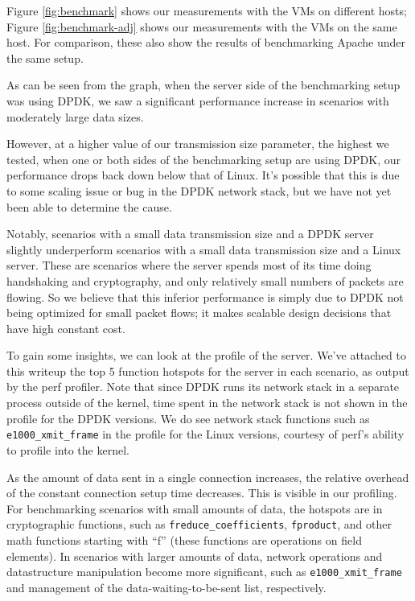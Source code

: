 \documentclass{sig-alternate-05-2015}
\begin{document}
Figure \ref{fig:benchmark} shows our measurements with the VMs on different hosts;
Figure \ref{fig:benchmark-adj} shows our measurements with the VMs on the same host.
For comparison, these also show the results of benchmarking Apache under the same setup.

As can be seen from the graph, when the server side of the benchmarking setup was using DPDK,
we saw a significant performance increase in scenarios with moderately large data sizes.

However, at a higher value of our transmission size parameter, the highest we tested,
when one or both sides of the benchmarking setup are using DPDK,
our performance drops back down below that of Linux.
It's possible that this is due to some scaling issue or bug in the DPDK network stack,
but we have not yet been able to determine the cause.

Notably, scenarios with a small data transmission size and a DPDK server
slightly underperform scenarios with a small data transmission size and a Linux server.
These are scenarios where the server spends most of its time doing handshaking and cryptography,
and only relatively small numbers of packets are flowing.
So we believe that this inferior performance is simply due to DPDK not being optimized for small packet flows;
it makes scalable design decisions that have high constant cost.

To gain some insights, we can look at the profile of the server.
We've attached to this writeup the top 5 function hotspots for the server in each scenario,
as output by the perf profiler.
Note that since DPDK runs its network stack in a separate process outside of the kernel,
time spent in the network stack is not shown in the profile for the DPDK versions.
We do see network stack functions such as \verb|e1000_xmit_frame| in the profile for the Linux versions,
courtesy of perf's ability to profile into the kernel.

As the amount of data sent in a single connection increases,
the relative overhead of the constant connection setup time decreases.
This is visible in our profiling.
For benchmarking scenarios with small amounts of data, the hotspots are in cryptographic functions,
such as \verb|freduce_coefficients|, \verb|fproduct|, and other math functions starting with ``f''
(these functions are operations on field elements).
In scenarios with larger amounts of data,
network operations and datastructure manipulation become more significant,
such as \verb|e1000_xmit_frame| and management of the data-waiting-to-be-sent list, respectively.
\end{document}
